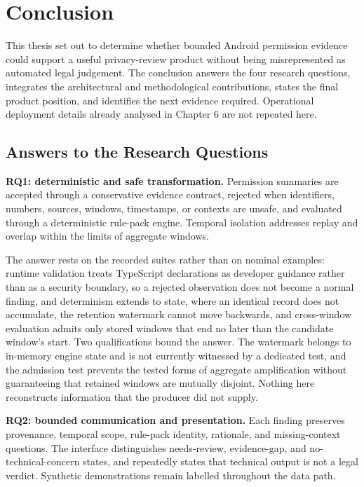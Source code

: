 \chapter{Conclusion}

This thesis set out to determine whether bounded Android permission evidence could support a useful privacy-review product without being misrepresented as automated legal judgement. The conclusion answers the four research questions, integrates the architectural and methodological contributions, states the final product position, and identifies the next evidence required. Operational deployment details already analysed in Chapter 6 are not repeated here.

\section{Answers to the Research Questions}

\textbf{RQ1: deterministic and safe transformation.} Permission summaries are accepted through a conservative evidence contract, rejected when identifiers, numbers, sources, windows, timestamps, or contexts are unsafe, and evaluated through a deterministic rule-pack engine. Temporal isolation addresses replay and overlap within the limits of aggregate windows.

The answer rests on the recorded suites rather than on nominal examples: runtime validation treats TypeScript declarations as developer guidance rather than as a security boundary, so a rejected observation does not become a normal finding, and determinism extends to state, where an identical record does not accumulate, the retention watermark cannot move backwards, and cross-window evaluation admits only stored windows that end no later than the candidate window's start. Two qualifications bound the answer. The watermark belongs to in-memory engine state and is not currently witnessed by a dedicated test, and the admission test prevents the tested forms of aggregate amplification without guaranteeing that retained windows are mutually disjoint. Nothing here reconstructs information that the producer did not supply.

\textbf{RQ2: bounded communication and presentation.} Each finding preserves provenance, temporal scope, rule-pack identity, rationale, and missing-context questions. The interface distinguishes needs-review, evidence-gap, and no-technical-concern states, and repeatedly states that technical output is not a legal verdict. Synthetic demonstrations remain labelled throughout the data path.


